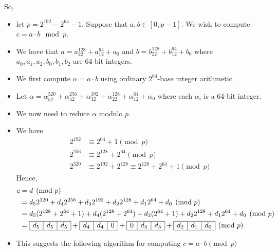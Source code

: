 \documentclass[12pt,titlepage]{article}
\begin{document}
So, 
\begin{itemize}
	\item let $p = 2^{192} - 2^{64} -1$. Suppose that $a, b \in [0, p-1]$. We wish to compute $c = a\cdot b \mod p$. 
	\item We have that $a = a_22^{128} + a_12^{64} + a_0$ and $b = b_22^{128} + b_12^{64} + b_0$ where $a_0, a_1, a_2, b_0, b_1, b_2$ are 64-bit integers.
	\item We first compute $\alpha = a \cdot b$ using ordinary $2^{64}$-base integer arithmetic. 
	\item Let $\alpha = \alpha_52^{320} + \alpha_42^{256} + \alpha_32^{192} + \alpha_22^{128} + \alpha_12^{64}+\alpha_0$ where each $\alpha_i$ is a 64-bit integer. 
	\item We now need to reduce $\alpha$ modulo $p$. 
	\item We have \begin{align*}
		2^{192} &\equiv 2^{64} + 1\pmod p\\
		2^{256} &\equiv 2^{128} + 2^{64}\pmod p\\
		2^{320} &\equiv 2^{192} + 2^{128} \equiv 2^{128} + 2^{64} + 1\pmod p
	\end{align*}
	Hence, \begin{align*}
		c &= d \pmod p\\
		&= d_52^{320} + d_42^{256} + d_32^{192} + d_22^{128} + d_12^{64} + d_0 \pmod p\\
		&= d_5(2^{128} + 2^{64} + 1) + d_4(2^{128} + 2^{64}) + d_3(2^{64} + 1) + d_22^{128} + d_12^{64} + d_0 \pmod p\\
		&=\begin{array}{|c|c|c|}
			\hline
			d_5&d_5&d_5\\
			\hline
		\end{array} + 
		\begin{array}{|c|c|c|}
			\hline
			d_4&d_4&0\\
			\hline
		\end{array} +
		\begin{array}{|c|c|c|}
			\hline
			0&d_3&d_3\\
			\hline
		\end{array} +
		\begin{array}{|c|c|c|}
			\hline
			d_2&d_1&d_0\\
			\hline
		\end{array}
		\pmod p
	\end{align*}
	\item This suggests the following algorithm for computing $c = a \cdot b \pmod p$
\end{itemize}
\end{document}
